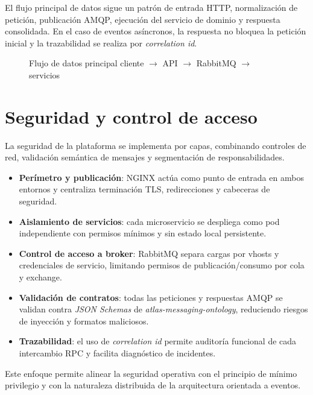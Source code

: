 El flujo principal de datos sigue un patrón de entrada HTTP, normalización de petición, publicación AMQP, ejecución del servicio de dominio y respuesta consolidada. En el caso de eventos asíncronos, la respuesta no bloquea la petición inicial y la trazabilidad se realiza por \textit{correlation id}.

\begin{figure}[H]
\centering
{}
\caption{Flujo de datos principal cliente $\rightarrow$ API $\rightarrow$ RabbitMQ $\rightarrow$ servicios}
\label{fig:flujo-datos}
\end{figure}

\section{Seguridad y control de acceso}

La seguridad de la plataforma se implementa por capas, combinando controles de red, validación semántica de mensajes y segmentación de responsabilidades.

\begin{itemize}
\item \textbf{Perímetro y publicación}: NGINX actúa como punto de entrada en ambos entornos y centraliza terminación TLS, redirecciones y cabeceras de seguridad.
\item \textbf{Aislamiento de servicios}: cada microservicio se despliega como pod independiente con permisos mínimos y sin estado local persistente.
\item \textbf{Control de acceso a broker}: RabbitMQ separa cargas por vhosts y credenciales de servicio, limitando permisos de publicación/consumo por cola y exchange.
\item \textbf{Validación de contratos}: todas las peticiones y respuestas AMQP se validan contra \textit{JSON Schemas} de \textit{atlas-messaging-ontology}, reduciendo riesgos de inyección y formatos maliciosos.
\item \textbf{Trazabilidad}: el uso de \textit{correlation id} permite auditoría funcional de cada intercambio RPC y facilita diagnóstico de incidentes.
\end{itemize}

Este enfoque permite alinear la seguridad operativa con el principio de mínimo privilegio y con la naturaleza distribuida de la arquitectura orientada a eventos.
